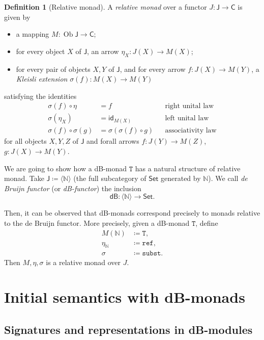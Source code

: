 \documentclass[a4paper,twoside,12pt,draft]{article}
\theoremstyle{definition}
\newtheorem{definition}{Definition}
\theoremstyle{remark}
\DeclareMathOperator{\Ob}{Ob}
\newcommand{\Category}[1]{\mathsf{#1}}
\newcommand{\CCat}{\Category{C}}
\newcommand{\JCat}{\Category{J}}
\newcommand{\SetCat}{\Category{Set}}
\newcommand{\NN}{\mathbb{N}}
\newcommand{\TT}{\mathtt{T}}
\newcommand{\subst}{\mathtt{subst}}
\newcommand{\refe}{\mathtt{ref}}
\begin{document}
\begin{definition}[Relative monad]
  A \emph{relative monad} over a functor $J\colon \JCat\to \CCat$ is
  given by
  \begin{itemize}
  \item a mapping $M:\Ob \JCat \to \CCat$;
  \item for every object $X$ of $\JCat$, an arrow
    $\eta_X\colon J(X) \to M(X)$;
  \item for every pair of objects $X,Y$ of $\JCat$, and for every
    arrow $f\colon J(X) \to M(Y)$, a \emph{Kleisli extension}
    $\sigma(f) \colon M(X) \to M(Y)$
  \end{itemize}
  satisfying the identities
  \begin{align*}
    \sigma(f) \circ \eta &= f &&\text{right unital law} \\
    \sigma(\eta_X) &= \mathsf{id}_{M(X)} &&\text{left unital law} \\
    \sigma(f) \circ \sigma(g) &= \sigma(\sigma(f) \circ g) &&\text{associativity law}
  \end{align*}
  for all objects $X,Y,Z$ of $\JCat$ and forall arrows
  $f\colon J(Y)\to M(Z)$, $g\colon J(X)\to M(Y)$.
\end{definition}

We are going to show how a dB-monad $\TT$ has a natural structure of
relative monad.  Take
$\JCat \coloneqq\langle \NN \rangle$ (the full
subcategory of $\SetCat$ generated by $\NN$).  We call \emph{de
  Bruijn functor} (or \emph{dB-functor}) the inclusion
\begin{equation}
  \label{eq:dB-functor}
  \mathsf{dB}\colon \langle \NN \rangle \to \SetCat.
\end{equation}

Then, it can be observed that dB-monads correspond precisely to monads
relative to the de Bruijn functor.  More precisely, given a dB-monad
$\TT$, define
\begin{align*}
  M(\NN) &\coloneqq \TT, \\
  \eta_\NN &\coloneqq \refe, \\
  \sigma &\coloneqq \subst.
\end{align*}
Then $M,\eta,\sigma$ is a relative monad over $J$.

\section{Initial semantics with dB-monads}
\label{sec:init-semantics}

\subsection{Signatures and representations in dB-modules}
\label{sec:signatures-representations}
\end{document}
